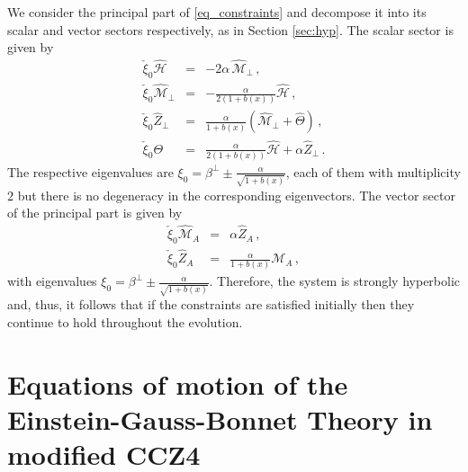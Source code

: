 \documentclass[reprint,aps,amsmath,amssymb,twoside,prd,showkeys,superscriptaddress,nofootinbib]{revtex4-2}
\begin{document}
We consider the principal part of \eqref{eq_constraints} and decompose it into its scalar and vector sectors respectively, as in Section \ref{sec:hyp}. The scalar sector is given by
\begin{subequations}
  \begin{eqnarray}
    \check{\xi}_0\hat{\mathcal H}&=&-2\alpha\,\hat{\mathcal M}_{\perp}\,,\\
    \check{\xi}_0\hat{\mathcal M}_{\perp}&=&-\tfrac{\alpha}{2(1+b(x))}\hat{\mathcal H}\,,\\
    \check{\xi}_0\hat{Z}_{\perp}&=&\tfrac{\alpha}{1+b(x)}(\hat{\mathcal M}_{\perp}+\hat{\Theta})\,,\\
    \check{\xi}_0\Theta&=&\tfrac{\alpha}{2(1+b(x))}\hat{\mathcal H}+\alpha\hat{Z}_{\perp}\,.
\end{eqnarray}  
\end{subequations}
The respective eigenvalues are $\xi_0=\beta^{\perp}\pm\tfrac{\alpha}{\sqrt{1+b(x)}}$, each of them with multiplicity $2$ but there is no degeneracy in the corresponding eigenvectors. The vector sector of the principal part is given by
\begin{subequations}
    \begin{eqnarray}
        \check{\xi}_0\hat{\mathcal M}_A&=&\alpha\hat{Z}_A\,,\\
        \check{\xi}_0\hat{Z}_A&=&\tfrac{\alpha}{1+b(x)}{\mathcal M}_A\,,
    \end{eqnarray}
\end{subequations}
with eigenvalues $\xi_0=\beta^{\perp}\pm\tfrac{\alpha}{\sqrt{1+b(x)}}$. Therefore, the system is strongly hyperbolic and, thus, it follows that if the constraints are satisfied initially then they continue to hold throughout the evolution.


\section{Equations of motion of the Einstein-Gauss-Bonnet Theory in modified CCZ4}
\label{app:eomegb}
\end{document}
